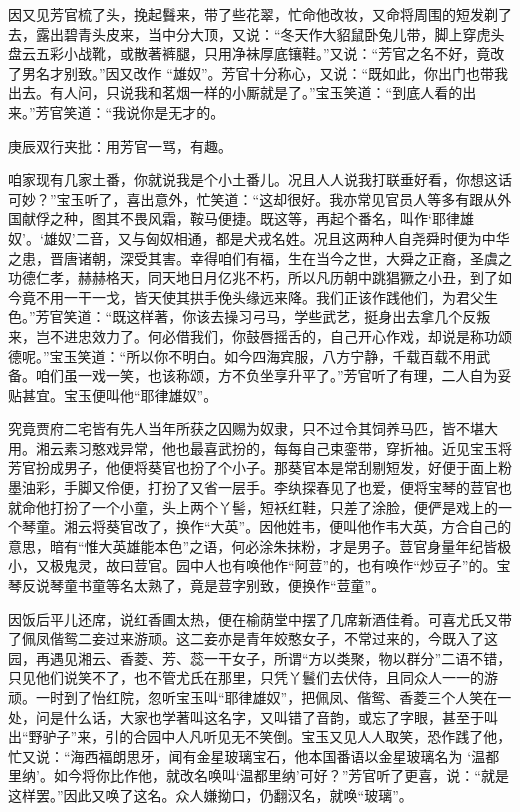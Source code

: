 \begin{parag}
    因又见芳官梳了头，挽起䰖来，带了些花翠，忙命他改妆，又命将周围的短发剃了去，露出碧青头皮来，当中分大顶，又说：“冬天作大貂鼠卧兔儿带，脚上穿虎头盘云五彩小战靴，或散著裤腿，只用净袜厚底镶鞋。”又说：“芳官之名不好，竟改了男名才别致。”因又改作 “雄奴”。芳官十分称心，又说：“既如此，你出门也带我出去。有人问，只说我和茗烟一样的小厮就是了。”宝玉笑道：“到底人看的出来。”芳官笑道：“我说你是无才的。\begin{note}庚辰双行夹批：用芳官一骂，有趣。\end{note}咱家现有几家土番，你就说我是个小土番儿。况且人人说我打联垂好看，你想这话可妙？”宝玉听了，喜出意外，忙笑道：“这却很好。我亦常见官员人等多有跟从外国献俘之种，图其不畏风霜，鞍马便捷。既这等，再起个番名，叫作‘耶律雄奴’。‘雄奴’二音，又与匈奴相通，都是犬戎名姓。况且这两种人自尧舜时便为中华之患，晋唐诸朝，深受其害。幸得咱们有福，生在当今之世，大舜之正裔，圣虞之功德仁孝，赫赫格天，同天地日月亿兆不朽，所以凡历朝中跳猖獗之小丑，到了如今竟不用一干一戈，皆天使其拱手俛头缘远来降。我们正该作践他们，为君父生色。”芳官笑道：“既这样著，你该去操习弓马，学些武艺，挺身出去拿几个反叛来，岂不进忠效力了。何必借我们，你鼓唇摇舌的，自己开心作戏，却说是称功颂德呢。”宝玉笑道：“所以你不明白。如今四海宾服，八方宁静，千载百载不用武备。咱们虽一戏一笑，也该称颂，方不负坐享升平了。”芳官听了有理，二人自为妥贴甚宜。宝玉便叫他“耶律雄奴”。
\end{parag}


\begin{parag}
    究竟贾府二宅皆有先人当年所获之囚赐为奴隶，只不过令其饲养马匹，皆不堪大用。湘云素习憨戏异常，他也最喜武扮的，每每自己束銮带，穿折袖。近见宝玉将芳官扮成男子，他便将葵官也扮了个小子。那葵官本是常刮剔短发，好便于面上粉墨油彩，手脚又伶便，打扮了又省一层手。李纨探春见了也爱，便将宝琴的荳官也就命他打扮了一个小童，头上两个丫髻，短袄红鞋，只差了涂脸，便俨是戏上的一个琴童。湘云将葵官改了，换作“大英”。因他姓韦，便叫他作韦大英，方合自己的意思，暗有“惟大英雄能本色”之语，何必涂朱抹粉，才是男子。荳官身量年纪皆极小，又极鬼灵，故曰荳官。园中人也有唤他作“阿荳”的，也有唤作“炒豆子”的。宝琴反说琴童书童等名太熟了，竟是荳字别致，便换作“荳童”。
\end{parag}


\begin{parag}
    因饭后平儿还席，说红香圃太热，便在榆荫堂中摆了几席新酒佳肴。可喜尤氏又带了佩凤偕鸳二妾过来游顽。这二妾亦是青年姣憨女子，不常过来的，今既入了这园，再遇见湘云、香菱、芳、蕊一干女子，所谓“方以类聚，物以群分”二语不错，只见他们说笑不了，也不管尤氏在那里，只凭丫鬟们去伏侍，且同众人一一的游顽。一时到了怡红院，忽听宝玉叫“耶律雄奴”，把佩凤、偕鸳、香菱三个人笑在一处，问是什么话，大家也学著叫这名字，又叫错了音韵，或忘了字眼，甚至于叫出“野驴子”来，引的合园中人凡听见无不笑倒。宝玉又见人人取笑，恐作践了他，忙又说：“海西福朗思牙，闻有金星玻璃宝石，他本国番语以金星玻璃名为 ‘温都里纳’。如今将你比作他，就改名唤叫‘温都里纳’可好？”芳官听了更喜，说：“就是这样罢。”因此又唤了这名。众人嫌拗口，仍翻汉名，就唤“玻璃”。
\end{parag}


